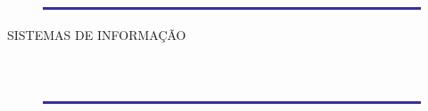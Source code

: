 \begin{titlepage}
  \begin{center}
    \begin{figure}[!htb]
      \centering
    \end{figure}

    \begin{figure}[!htb]
      \centering
      \includegraphics[width=1\textwidth]{figuras/barrafap}
    \end{figure}

    \large{SISTEMAS DE INFORMAÇ\~AO}\\[3cm]
    \Large{\textbf{\AUTOR}}\\[5cm]
    \Large{\textbf{\TITULO}}\\
    \vfill

    \begin{figure}[!htb]
      \centering
      \includegraphics[width=1\textwidth]{figuras/barrafap}
    \end{figure}

    \begin{normalsize}
      \LOCAL\\
      \DATA
    \end{normalsize}
  \end{center}
\end{titlepage}
